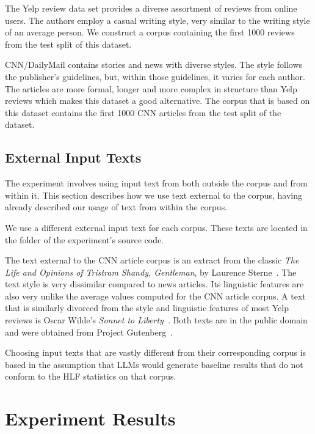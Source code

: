 \documentclass[11pt]{article}
\begin{document}
The Yelp review data set provides a diverse assortment of reviews from online
users.
The authors employ a casual writing style, very similar to the writing style of
an average person.
We construct a corpus containing the first 1000 reviews from the test split of
this dataset.

CNN/DailyMail contains stories and news with diverse styles.
The style follows the publisher's guidelines, but, within those guidelines, it
varies for each author.
The articles are more formal, longer and more complex in structure than Yelp
reviews which makes this dataset a good alternative.
The corpus that is based on this dataset contains the first 1000 CNN articles
from the test split of the dataset.

\subsection{External Input Texts}\label{input-text}

The experiment involves using input text from both outside the corpus and from
within it.
This section describes how we use text external to the corpus, having already
described our usage of text from within the corpus.

We use a different external input text for each corpus.
These texts are located in the
\texttt{}
folder of the experiment's source code.

The text external to the CNN article corpus is an extract from the classic
\textit{The Life and Opinions of Tristram Shandy, Gentleman}, by Laurence
Sterne~\cite{sterne2003life}.
The text style is very dissimilar compared to news articles.
Its linguistic features are also very unlike the average values computed for the
CNN article corpus.
A text that is similarly divorced from the style and linguistic features of most
Yelp reviews is Oscar Wilde's \textit{Sonnet to Liberty}~\cite{wilde1909poems}.
Both texts are in the public domain and were obtained from Project
Gutenberg~\cite{gutenberg}.

Choosing input texts that are vastly different from their corresponding corpus
is based in the assumption that LLMs would generate baseline results that do not
conform to the HLF statistics on that corpus.

\section{Experiment Results}
\end{document}
